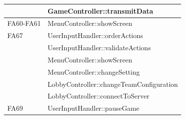 \begin{center}
\begin{tabular}{|l|l|}
		& GameController::transmitData\\\hline
		FA60-FA61 & MenuController::showScreen\\\hline
		FA67 & UserInputHandler::orderActions\\
		& UserInputHandler::validateActions\\
		& MenuController::showScreen\\
		& MenuController::changeSetting\\
		& LobbyController::changeTeamConfiguration\\
		& LobbyController::connectToServer\\\hline
		FA69 & UserInputHandler::pauseGame\\\hline
		
	\end{tabular}
\end{center}
